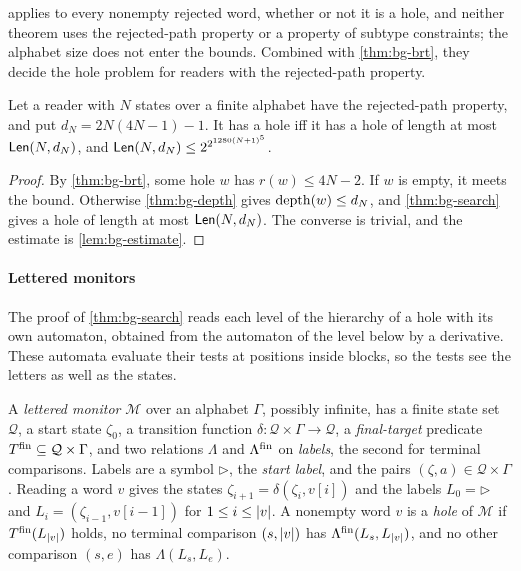  applies to every nonempty rejected word, whether or not it
is a hole, and neither theorem uses the rejected-path property or a property of
subtype constraints; the alphabet size does not enter the bounds. Combined with
\cref{thm:bg-brt}, they decide the hole problem for readers with the
rejected-path property.

\begin{corollary}\label{cor:bg-hole-decision}
Let a reader with $N$ states over a finite alphabet have the rejected-path
property, and put $d_N=2N(4N-1)-1$. It has a hole iff it has a hole of length
at most $\mathsf{Len}(N,d_N)$, and $\mathsf{Len}(N,d_N)\le2^{2^{1280(N+1)^5}}$.
\end{corollary}
\begin{proof}
By \cref{thm:bg-brt}, some hole $w$ has $r(w)\le4N-2$. If $w$ is empty, it meets
the bound. Otherwise \cref{thm:bg-depth} gives $\operatorname{depth}(w)\le d_N$, and
\cref{thm:bg-search} gives a hole of length at most $\mathsf{Len}(N,d_N)$. The
converse is trivial, and the estimate is \cref{lem:bg-estimate}.
\end{proof}

\paragraph{Lettered monitors}
The proof of \cref{thm:bg-search} reads each level of the hierarchy of a hole
with its own automaton, obtained from the automaton of the level below by a
derivative. These automata evaluate their tests at positions inside blocks, so
the tests see the letters as well as the states.

\begin{definition}\label{def:bg-monitor}
A \emph{lettered monitor} $\mathcal M$ over an alphabet $\Gamma$, possibly
infinite, has a finite state set $\mathcal Q$, a start state $\zeta_0$, a
transition function $\delta:\mathcal Q\times\Gamma\to\mathcal Q$, a
\emph{final-target} predicate $T^{\mathrm{fin}}\subseteq\mathcal Q\times\Gamma$, and two
relations $\Lambda$ and $\Lambda^{\mathrm{fin}}$ on \emph{labels}, the second for terminal
comparisons. Labels are a symbol $\triangleright$, the \emph{start label}, and
the pairs $(\zeta,a)\in\mathcal Q\times\Gamma$. Reading a word $v$ gives the
states $\zeta_{i+1}=\delta(\zeta_i,v[i])$ and the labels $L_0=\triangleright$
and $L_i=(\zeta_{i-1},v[i-1])$ for $1\le i\le\lvert v\rvert$. A nonempty word $v$ is a
\emph{hole} of $\mathcal M$ if $T^{\mathrm{fin}}(L_{\lvert v\rvert})$ holds, no terminal comparison
$(s,\lvert v\rvert)$ has $\Lambda^{\mathrm{fin}}(L_s,L_{\lvert v\rvert})$, and no other comparison $(s,e)$ has
$\Lambda(L_s,L_e)$.
\end{definition}

